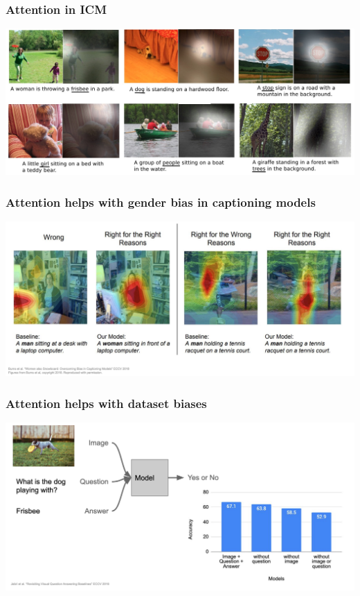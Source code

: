 \documentclass[aspectratio=1610]{beamer} %
\begin{document}
\begin{frame}
\frametitle{Attention in ICM}
\begin{center}
\includegraphics[width=1\textwidth]{pics/att9}
\end{center}
\end{frame}

\begin{frame}
\frametitle{Attention helps with gender bias in captioning models}
\begin{center}
\includegraphics[width=1\textwidth]{pics/imp1}
\end{center}
\end{frame}

\begin{frame}
\frametitle{Attention helps with dataset biases}
\begin{center}
\includegraphics[width=1\textwidth]{pics/imp2}
\end{center}
\end{frame}
\end{document}
